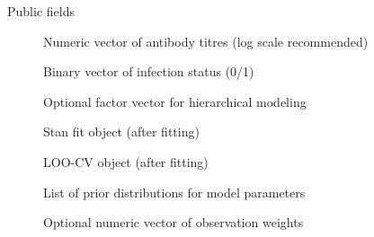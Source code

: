 \documentclass[a4paper]{book}
\begin{document}
%
\begin{Section}{Public fields}

\begin{description}

\item[] Numeric vector of antibody titres (log scale recommended)

\item[] Binary vector of infection status (0/1)

\item[] Optional factor vector for hierarchical modeling

\item[] Stan fit object (after fitting)

\item[] LOO-CV object (after fitting)

\item[] List of prior distributions for model parameters

\item[] Optional numeric vector of observation weights

\end{description}


\end{Section}
%
\end{document}
